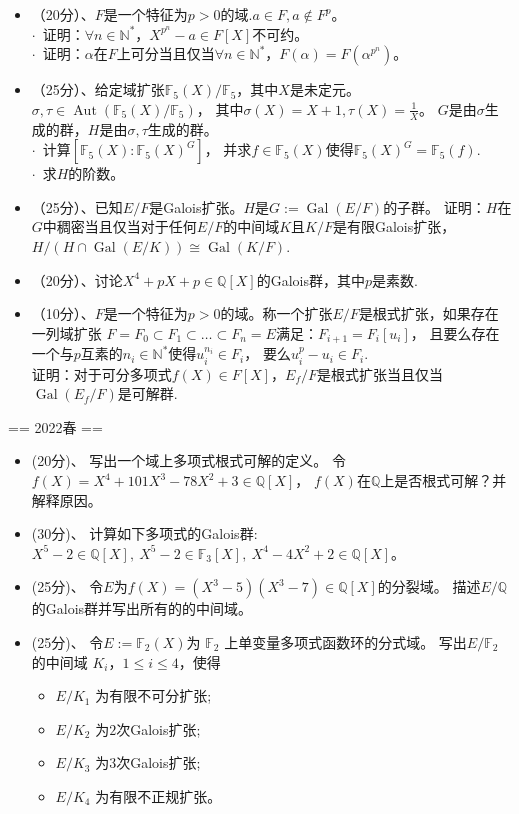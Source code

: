 \begin{itemize}
\item[一]（20分）、$F$是一个特征为$p>0$的域.$a\in F,a\notin F^p$。\\
$\cdot$\ 证明：$\forall n \in \mathbb{N}^*$，$ X^{p^n}-a \in F[X]$不可约。\\
$\cdot$\ 证明：$\alpha$在$F$上可分当且仅当$\forall n\in \mathbb{N}^*$，$F(\alpha)=F(\alpha^{p^n})$。
\item[二]（25分）、给定域扩张$\mathbb{F}_5(X)/\mathbb{F}_5$，其中$X$是未定元。
$\sigma ,\tau \in \operatorname{Aut}(\mathbb{F}_5(X)/\mathbb{F}_5)$，
其中$\sigma(X)=X+1,\tau(X)=\frac{1}{X}$。
$G$是由$\sigma$生成的群，$H$是由$\sigma,\tau$生成的群。\\
$\cdot$\ 计算$[\mathbb{F}_5(X):\mathbb{F}_5(X)^G]$，
并求$f\in \mathbb{F}_5(X)$使得$\mathbb{F}_5(X)^G=\mathbb{F}_5(f)$.\\
$\cdot$\ 求$H$的阶数。
\item[三]（25分）、已知$E/F$是Galois扩张。$H$是$G:=\operatorname{Gal}(E/F)$的子群。
证明：$H$在$G$中稠密当且仅当对于任何$E/F$的中间域$K$且$K/F$是有限Galois扩张，
$H/(H\cap \operatorname{Gal}(E/K))\cong \operatorname{Gal}(K/F)$.
\item[四]（20分）、讨论$X^4+pX+p\in \mathbb{Q}[X]$的Galois群，其中$p$是素数.
\item[五]（10分）、$F$是一个特征为$p>0$的域。称一个扩张$E/F$是根式扩张，如果存在一列域扩张
$F=F_0\subset F_1\subset \ldots \subset F_n=E$满足：$F_{i+1}=F_i[u_i]$，
且要么存在一个与$p$互素的$n_i\in\mathbb{N}^*$使得$u_i^{n_i}\in F_i$，
要么$u_i^p-u_i\in F_i$.\\
证明：对于可分多项式$f(X)\in F[X]$，$E_f/F$是根式扩张当且仅当
$\operatorname{Gal}(E_f/F)$是可解群.
\end{itemize}

== 2022春 ==

\begin{itemize}
\item[一] (20分)、 写出一个域上多项式根式可解的定义。
令$f(X)=X^{4}+101X^{3}-78X^{2}+3\in  \mathbb{Q}[X]$，
$f(X)$在$\mathbb{Q}$上是否根式可解？并解释原因。
\item[二](30分)、 计算如下多项式的Galois群: 
$X^{5}-2 \in \mathbb{Q}[X],\ X^{5}-2 \in \mathbb{F}_{3}[X],\ X^{4}-4X^{2}+2 \in \mathbb{Q}[X]$。
\item[三] (25分)、 令$E$为$f(X)=(X^{3}-5)(X^{3}-7) \in \mathbb{Q}[X]$的分裂域。
描述$E/\mathbb{Q}$的Galois群并写出所有的的中间域。
\item[四] (25分)、 令$E:=\mathbb{F}_{2}(X)$为 $\mathbb{F}_{2}$ 上单变量多项式函数环的分式域。
写出$E/\mathbb{F}_{2}$ 的中间域 $ K_{i}$，$1 \leqslant i \leqslant 4$，使得
\begin{itemize}
    \item
    $E/K_{1}$ 为有限不可分扩张;
    \item
    $E/K_{2}$ 为$2$次Galois扩张;
    \item
    $E/K_{3}$ 为$3$次Galois扩张;
    \item
    $E/K_{4}$ 为有限不正规扩张。
\end{itemize}
\end{itemize}

